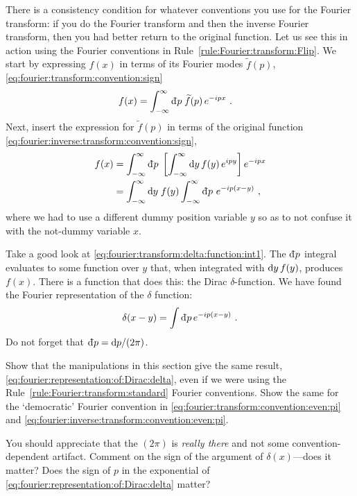 There is a consistency condition for whatever conventions you use for the Fourier transform: if you do the Fourier transform and then the inverse Fourier transform, then you had better return to the original function. Let us see this in action using the Fourier conventions in Rule~\ref{rule:Fourier:transform:Flip}. We start by expressing $f(x)$ in terms of its Fourier modes $\tilde f(p)$, \eqref{eq:fourier:transform:convention:sign}
\begin{align}
    f(x) &= 
    \int_{-\infty}^\infty \Dbar{p}\; 
    \tilde f(p)\,
    e^{-ipx} 
    \ .
\end{align}
Next, insert the expression for $\tilde f(p)$ in terms of the original function \eqref{eq:fourier:inverse:transform:convention:sign},
\begin{align}
f(x) &= 
    \int_{-\infty}^\infty \Dbar{p}\; 
    \left[
     \int_{-\infty}^\infty \D{y}\, f(y)\, e^{ipy} 
    \right]
    e^{-ipx} 
    \\
    &=
    \int_{-\infty}^\infty \D{y}\; f(y)
    \int_{-\infty}^\infty \Dbar{p}\, \, e^{-ip(x-y)} 
    \ ,
    \label{eq:fourier:transform:delta:function:int1}
\end{align}
where we had to use a different dummy position variable $y$ so as to not confuse it with the not-dummy variable $x$. 

Take a good look at \eqref{eq:fourier:transform:delta:function:int1}. The $\Dbar{p}$ integral evaluates to some function over $y$ that, when integrated with $\operatorname{d}\mkern-3mu^{}\mkern-1mu{y}\, f(y)$, produces $f(x)$. There is a function that does this: the Dirac $\delta$-function. We have found the Fourier representation of the $\delta$ function:
\begin{align}
    \delta(x-y) = \int \Dbar{p}\, e^{-ip(x-y)} \ .
    \label{eq:fourier:representation:of:Dirac:delta}
\end{align}
Do not forget that $\Dbar{p} = \D{p}/(2\pi)$.

\begin{exercise}
Show that the manipulations in this section give the same result, \eqref{eq:fourier:representation:of:Dirac:delta}, even if we were using the Rule~\ref{rule:Fourier:transform:standard} Fourier conventions. Show the same for the `democratic' Fourier convention in \eqref{eq:fourier:transform:convention:even:pi} and \eqref{eq:fourier:inverse:transform:convention:even:pi}.

You should appreciate that the $(2\pi)$ is \emph{really there} and not some convention-dependent artifact. Comment on the sign of the argument of $\delta(x)$---does it matter? Does the sign of $p$ in the exponential of \eqref{eq:fourier:representation:of:Dirac:delta} matter?
\end{exercise}

